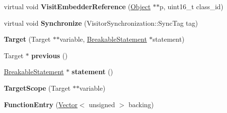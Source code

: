 \begin{DoxyCompactItemize}
\item 
virtual void {\bfseries Visit\+Embedder\+Reference} (\hyperlink{classv8_1_1internal_1_1_object}{Object} $\ast$$\ast$p, uint16\+\_\+t class\+\_\+id)\hypertarget{classv8_1_1internal_1_1_b_a_s_e___e_m_b_e_d_d_e_d_afe591f8b17a1098f1db139442af76c96}{}\label{classv8_1_1internal_1_1_b_a_s_e___e_m_b_e_d_d_e_d_afe591f8b17a1098f1db139442af76c96}

\item 
virtual void {\bfseries Synchronize} (Visitor\+Synchronization\+::\+Sync\+Tag tag)\hypertarget{classv8_1_1internal_1_1_b_a_s_e___e_m_b_e_d_d_e_d_afd7ddf680b5f38b724614075df542f40}{}\label{classv8_1_1internal_1_1_b_a_s_e___e_m_b_e_d_d_e_d_afd7ddf680b5f38b724614075df542f40}

\item 
{\bfseries Target} (Target $\ast$$\ast$variable, \hyperlink{classv8_1_1internal_1_1_breakable_statement}{Breakable\+Statement} $\ast$statement)\hypertarget{classv8_1_1internal_1_1_b_a_s_e___e_m_b_e_d_d_e_d_a55e0ef3961d38774d356b04169f73ba5}{}\label{classv8_1_1internal_1_1_b_a_s_e___e_m_b_e_d_d_e_d_a55e0ef3961d38774d356b04169f73ba5}

\item 
Target $\ast$ {\bfseries previous} ()\hypertarget{classv8_1_1internal_1_1_b_a_s_e___e_m_b_e_d_d_e_d_ace48a6dbd7b9d3357585b594747da115}{}\label{classv8_1_1internal_1_1_b_a_s_e___e_m_b_e_d_d_e_d_ace48a6dbd7b9d3357585b594747da115}

\item 
\hyperlink{classv8_1_1internal_1_1_breakable_statement}{Breakable\+Statement} $\ast$ {\bfseries statement} ()\hypertarget{classv8_1_1internal_1_1_b_a_s_e___e_m_b_e_d_d_e_d_af7747a160cfe90c4476ad0f576c69c6e}{}\label{classv8_1_1internal_1_1_b_a_s_e___e_m_b_e_d_d_e_d_af7747a160cfe90c4476ad0f576c69c6e}

\item 
{\bfseries Target\+Scope} (Target $\ast$$\ast$variable)\hypertarget{classv8_1_1internal_1_1_b_a_s_e___e_m_b_e_d_d_e_d_a74163f9e7ad9a8d0c13cd7eb49f6c130}{}\label{classv8_1_1internal_1_1_b_a_s_e___e_m_b_e_d_d_e_d_a74163f9e7ad9a8d0c13cd7eb49f6c130}

\item 
{\bfseries Function\+Entry} (\hyperlink{classv8_1_1internal_1_1_vector}{Vector}$<$ unsigned $>$ backing)\hypertarget{classv8_1_1internal_1_1_b_a_s_e___e_m_b_e_d_d_e_d_a98c242f94bcd72510137acee877b3416}{}\label{classv8_1_1internal_1_1_b_a_s_e___e_m_b_e_d_d_e_d_a98c242f94bcd72510137acee877b3416}


\end{DoxyCompactItemize}
